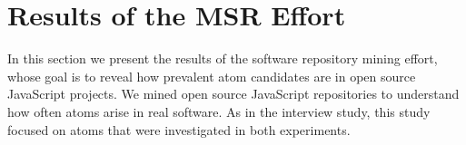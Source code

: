 
\section{Results of the MSR Effort}
\label{sec:msr-results} 

In this section we present the results of the  software repository mining effort, whose goal is to reveal how prevalent atom candidates are in open source JavaScript projects. 
We mined \minedprojects open source JavaScript repositories to understand how
often atoms arise in real software. As in the interview study, this study focused on atoms that were investigated in both experiments.  



